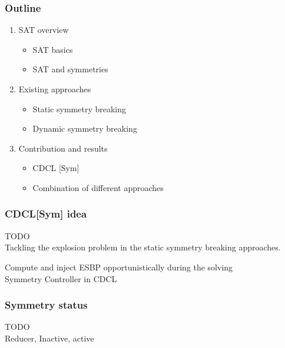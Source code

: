 \documentclass{beamer}
\begin{document}
\begin{frame}
\frametitle{Outline}
\begin{enumerate}
	\item \textcolor{UPMCEngagementBlueB}{SAT overview}
	\begin{itemize}
		\item[] SAT basics
		\item[] SAT and symmetries
	\end{itemize}
	\vspace{5pt}
	\item \textcolor{UPMCEngagementBlueB}{Existing approaches}
	\begin{itemize}
		\item[] Static symmetry breaking
		\item[] Dynamic symmetry breaking
	\end{itemize}
	\vspace{5pt}
	\item \textcolor{UPMCEngagementBlueB}{Contribution and results} 
	\begin{itemize}
		\item[] CDCL [Sym]
		\item[] Combination of different approaches
	\end{itemize}
\end{enumerate}
\end{frame}

\begin{frame}
\frametitle{CDCL[Sym] idea}
TODO\\

Tackling the explosion problem in the static
symmetry breaking approaches.


Compute and inject ESBP opportunistically during the solving\\


Symmetry Controller in CDCL\\


\end{frame}

\begin{frame}
\frametitle{Symmetry status}
TODO\\

Reducer, Inactive, active\\

\end{frame}
\end{document}
